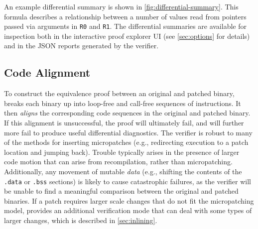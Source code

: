 An example differential summary is shown in \cref{fig:differential-summary}. %
This formula describes a relationship between a number of values read from pointers passed via arguments in \lstinline{R0} and \lstinline{R1}. %
The differential summaries are available for inspection both in the interactive proof explorer UI (see \cref{sec:options} for details) and in the JSON reports generated by the verifier. %

\subsection{Code Alignment}

To construct the equivalence proof between an original and patched binary, \TOOL{} breaks each binary up into loop-free and call-free sequences of instructions. %
It then \emph{aligns} the corresponding code sequences in the original and patched binary. %
If this alignment is unsuccessful, the proof will ultimately fail, and will further more fail to produce useful differential diagnostics. %
The verifier is robust to many of the methods for inserting micropatches (e.g., redirecting execution to a patch location and jumping back). %
Trouble typically arises in the presence of larger code motion that can arise from recompilation, rather than micropatching. %
Additionally, any movement of mutable \emph{data} (e.g., shifting the contents of the \lstinline{.data} or \lstinline{.bss} sections) is likely to cause catastrophic failures, as the verifier will be unable to find a meaningful comparison between the original and patched binaries. %
If a patch requires larger scale changes that do not fit the micropatching model, \TOOL{} provides an additional verification mode that can deal with some types of larger changes, which is described in \cref{sec:inlining}.
